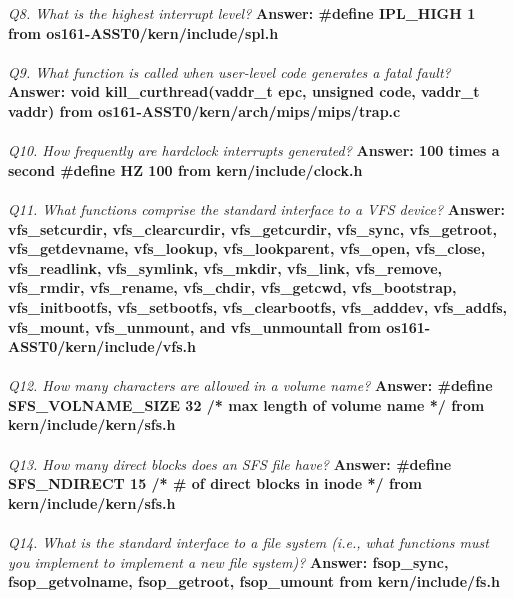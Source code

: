 \documentclass[11pt, english]{article}
\begin{document}
\textit{Q8. What is the highest interrupt level?}\newline
\textbf{Answer: \#define IPL\_HIGH   1
	from  os161-ASST0/kern/include/spl.h
}\\ \\
\textit{Q9. What function is called when user-level code generates a fatal fault?}\newline %
\textbf{Answer: void kill\_curthread(vaddr\_t epc, unsigned code, vaddr\_t vaddr)
	from os161-ASST0/kern/arch/mips/mips/trap.c
}\\ \\
\textit{Q10. How frequently are hardclock interrupts generated?}\newline
\textbf{Answer: 100 times a second   \#define HZ  100
	from kern/include/clock.h
}\\ \\ %
\textit{Q11. What functions comprise the standard interface to a VFS device?}\newline
\textbf{Answer: vfs\_setcurdir, vfs\_clearcurdir, vfs\_getcurdir, vfs\_sync, vfs\_getroot,
	vfs\_getdevname, vfs\_lookup, vfs\_lookparent, vfs\_open, vfs\_close,
	vfs\_readlink, vfs\_symlink, vfs\_mkdir, vfs\_link, vfs\_remove, vfs\_rmdir,
	vfs\_rename, vfs\_chdir, vfs\_getcwd, vfs\_bootstrap, vfs\_initbootfs,
	vfs\_setbootfs, vfs\_clearbootfs, vfs\_adddev, vfs\_addfs, vfs\_mount,
	vfs\_unmount, and vfs\_unmountall
	from  os161-ASST0/kern/include/vfs.h
}\\ \\
\textit{Q12. How many characters are allowed in a volume name?}\newline
\textbf{Answer: \#define SFS\_VOLNAME\_SIZE  32  /* max length of volume name */
	from kern/include/kern/sfs.h
}\\ \\
\textit{Q13. How many direct blocks does an SFS file have?}\newline
\textbf{Answer: \#define SFS\_NDIRECT       15            /* \# of direct blocks in inode */
	from kern/include/kern/sfs.h
}\\ \\
\textit{Q14. What is the standard interface to a file system (i.e., what functions must you
	implement to implement a new file system)?}\newline
\textbf{Answer: fsop\_sync, fsop\_getvolname, fsop\_getroot, fsop\_umount
	from kern/include/fs.h
}\\ \\
\end{document}
